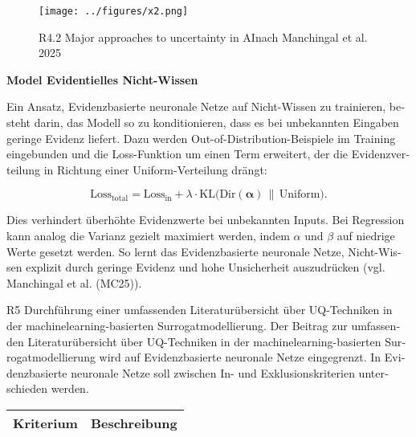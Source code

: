 \begin{otherlanguage}{ngerman}
\begin{figure}[!ht]
  \centering
  \texttt{[image: ../figures/x2.png]}
  \caption{R4.2 \glqq Major approaches to uncertainty in AI\grqq nach Manchingal et al. 2025}
\end{figure}


\textbf{Model Evidentielles Nicht-Wissen}

Ein Ansatz, \gls{Evidenzbasierte neuronale Netze} auf Nicht-Wissen zu trainieren, besteht darin, das Modell so zu konditionieren, dass es bei unbekannten Eingaben geringe Evidenz liefert. Dazu werden \gls{Out-of-Distribution}-Beispiele im Training eingebunden und die Loss-Funktion um einen Term erweitert, der die Evidenzverteilung in Richtung einer Uniform-Verteilung drängt:

\begin{equation}
\text{Loss}_{\text{total}} 
= \text{Loss}_{\text{in}} 
+ \lambda \cdot \text{KL}\bigl(\text{Dir}(\boldsymbol{\alpha}) \,\|\, \text{Uniform}\bigr).
\end{equation}

Dies verhindert überhöhte Evidenzwerte bei unbekannten Inputs. Bei Regression kann analog die Varianz gezielt maximiert werden, indem $\alpha$ und $\beta$ auf niedrige Werte gesetzt werden. So lernt das \gls{Evidenzbasierte neuronale Netze}, Nicht-Wissen explizit durch geringe Evidenz und hohe Unsicherheit auszudrücken (vgl. Manchingal et al. (MC25)).



\pagebreak


R5 Durchführung einer umfassenden Literaturübersicht über UQ-Techniken in der \gls{machinelearning}-basierten Surrogatmodellierung.
\newline
Der Beitrag zur umfassenden Literaturübersicht über UQ-Techniken in der \gls{machinelearning}-basierten Surrogatmodellierung wird auf \gls{Evidenzbasierte neuronale Netze} eingegrenzt. In \gls{Evidenzbasierte neuronale Netze} soll zwischen In- und Exklusionskriterien unterschieden werden.

\begin{table}[htbp]
\centering
\footnotesize
\begin{tabularx}{\textwidth}{|l|X|}
\hline
\textbf{Kriterium} & \textbf{Beschreibung} \\ \hline


\end{tabularx}
\end{table}
\end{otherlanguage}
